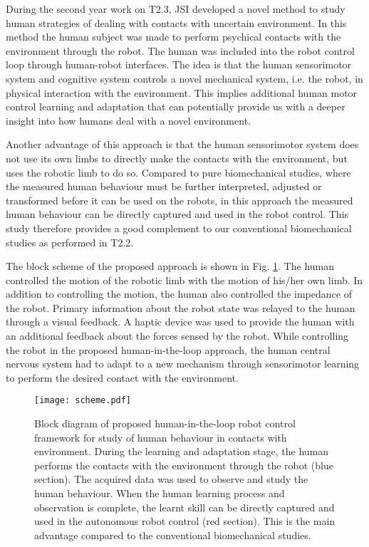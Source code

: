 During the second year work on T2.3, JSI developed a novel method to study human strategies of dealing with contacts with uncertain environment. In this method the human subject was made to perform psychical contacts with the environment through the robot. The human was included into the robot control loop through human-robot interfaces. The idea is that the human sensorimotor system and cognitive system controls a novel mechanical system, i.e. the robot, in physical interaction with the environment. This implies additional human motor control learning and adaptation that can potentially provide us with a deeper insight into how humans deal with a novel environment.

Another advantage of this approach is that the human sensorimotor system does not use its own limbs to directly make the contacts with the environment, but uses the robotic limb to do so. Compared to pure biomechanical studies, where the measured human behaviour must be further interpreted, adjusted or transformed before it can be used on the robots, in this approach the measured human behaviour can be directly captured and used in the robot control. This study therefore provides a good complement to our conventional biomechanical studies as performed in T2.2.

The block scheme of the proposed approach is shown in Fig. \ref{fig:scheme}. The human controlled the motion of the robotic limb with the motion of his/her own limb. In addition to controlling the motion, the human also controlled the impedance of the robot. Primary information about the robot state was relayed to the human through a visual feedback. A haptic device was used to provide the human with an additional feedback about the forces sensed by the robot. While controlling the robot in the proposed human-in-the-loop approach, the human central nervous system had to adapt to a new mechanism through sensorimotor learning to perform the desired contact with the environment.
\begin{figure}[!t]
  \centering
  \texttt{[image: scheme.pdf]}
  \caption{Block diagram of proposed human-in-the-loop robot control framework for study of human behaviour in contacts with environment. During the learning and adaptation stage, the human performs the contacts with the environment through the robot (blue section). The acquired data was used to observe and study the human behaviour. When the human learning process and observation is complete, the learnt skill can be directly captured and used in the autonomous robot control (red section). This is the main advantage compared to the conventional biomechanical studies.}
  \label{fig:scheme}
\end{figure}

